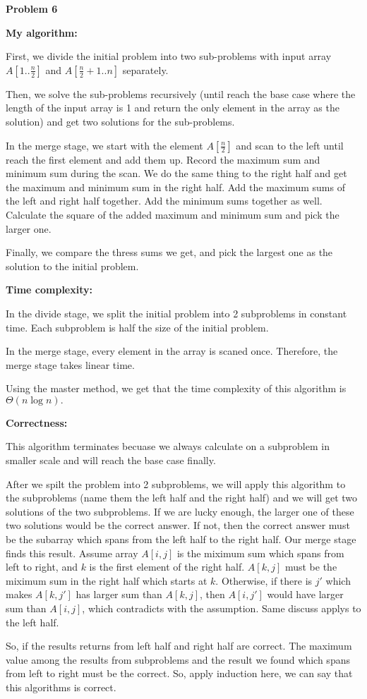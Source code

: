 \documentclass[12pt,letterpaper]{article}
\def\pp{\par\noindent}
\newcommand{\problem}[1]{ \bigskip \pp \textbf{Problem #1}\par}
\begin{document}
\problem{6}
\textbf{My algorithm:}\par
First, we divide the initial problem into two sub-problems with input array $A[1..\frac{n}{2}]$ and $A[\frac{n}{2}+1..n]$ separately.\par 
Then, we solve the sub-problems recursively (until reach the base case where the length of the input array is 1 and return the only element in the array as the solution) and get two solutions for the sub-problems.\par
In the merge stage, we start with the element $A[\frac{n}{2}]$ and scan to the left until reach the first element and add them up. Record the maximum sum and minimum sum during the scan. We do the same thing to the right half and get the maximum and minimum sum in the right half. Add the maximum sums of the left and right half together. Add the minimum sums together as well. Calculate the square of the added maximum and minimum sum and pick the larger one.\par
Finally, we compare the thress sums we get, and pick the largest one as the solution to the initial problem.\par
\textbf{Time complexity:}\par
In the divide stage, we split the initial problem into 2 subproblems in constant time. Each subproblem is half the size of the initial problem.\par
In the merge stage, every element in the array is scaned once. Therefore, the merge stage takes linear time.\par
Using the master method, we get that the time complexity of this algorithm is $\Theta(n\log n).$\par
\textbf{Correctness:}\par
This algorithm terminates becuase we always calculate on a subproblem in smaller scale and will reach the base case finally.\par
After we spilt the problem into 2 subproblems, we will apply this algorithm to the subproblems (name them the left half and the right half) and we will get two solutions of the two subproblems. If we are lucky enough, the larger one of these two solutions would be the correct answer. If not, then the correct answer must be the subarray which spans from the left half to the right half. Our merge stage finds this result. Assume array $A[i, j]$ is the miximum sum which spans from left to right, and $k$ is the first element of the right half. $A[k, j]$ must be the miximum sum in the right half which starts at $k$. Otherwise, if there is $j'$ which makes $A[k, j']$ has larger sum than $A[k, j]$, then $A[i, j']$ would have larger sum than $A[i, j]$, which contradicts with the assumption. Same discuss applys to the left half.\par
So, if the results returns from left half and right half are correct. The maximum value among the results from subproblems and the result we found which spans from left to right must be the correct. So, apply induction here, we can say that this algorithms is correct.\par
\end{document}
